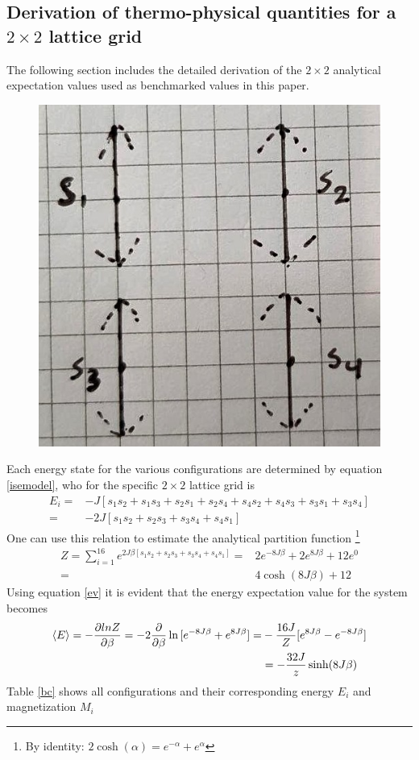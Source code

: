 \documentclass[%
reprint,nofootinbib,
amsmath,amssymb,
aps,
]{revtex4-1}
\begin{document}
\subsection{Derivation of thermo-physical quantities for a $2\times 2$ lattice grid} \noindent 
The following section includes the detailed derivation of the $2\times 2$ analytical expectation values used as benchmarked values in this paper. 
\begin{figure}[!h]
	\includegraphics[scale = 0.5]{Figures/si.jpg}
	\caption{\label{si}}
\end{figure}
Each energy state for the various configurations are determined by equation \ref{isemodel}, who for the specific $2\times2$ lattice grid is
\begin{align*}
E_i  =& -J[s_1s_2 + s_1s_3 + s_2s_1+s_2s_4+s_4s_2+s_4s_3 + s_3s_1 + s_3s_4] \nonumber \\
= &-2J[s_1s_2 + s_2s_3 + s_3s_4 + s_4s_1]
\end{align*}\vspace{1mm} 
One can use this relation to estimate the analytical partition function \footnote{By identity: $2\cosh(\alpha) = e^{-\alpha} + e^{\alpha}$}
\begin{align*}
Z = \sum_{i = 1}^{16}e^{2J\beta[s_1s_2 + s_2s_3 + s_3s_4 + s_4s_1]}
=&  2e^{-8J\beta} + 2e^{8J\beta} + 12e^0\nonumber \\
= & 4\cosh(8J\beta) + 12 
\end{align*} 
Using equation \ref{ev} it is evident that the energy expectation value for the system becomes 
\begin{align*}
\expval{E} = -\dfrac{\partial ln Z}{\partial \beta} = -2\dfrac{\partial}{\partial \beta}\ln{[e^{-8J\beta} + e^{8J\beta}]} =& -\dfrac{16J}{Z}[e^{8J\beta} - e^{-8J\beta}] \\ 
& = -\dfrac{32J}{z}\sinh(8J\beta)
\end{align*}
Table \ref{bc} shows all configurations and their corresponding energy $E_i$ and magnetization $M_i$
\end{document}
